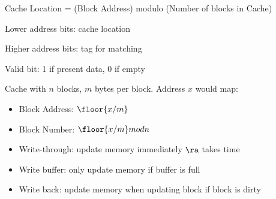 \begin{multicols}{2}
    \par Cache Location = (Block Address) modulo (Number of blocks in Cache)
    \par Lower address bits: cache location
    \par Higher address bits: tag for matching
    \par Valid bit: 1 if present data, 0 if empty
    \par Cache with $n$ blocks, $m$ bytes per block. Address $x$ would map:
    \begin{itemize}
      \item Block Address: $\floor{x / m}$
      \item Block Number: $\floor{x / m} mod n$
    \end{itemize}
    \begin{itemize}
      \item Write-through: update memory immediately $\ra$ takes time
      \item Write buffer: only update memory if buffer is full
      \item Write back: update memory when updating block if block is dirty
    \end{itemize}
\end{multicols}